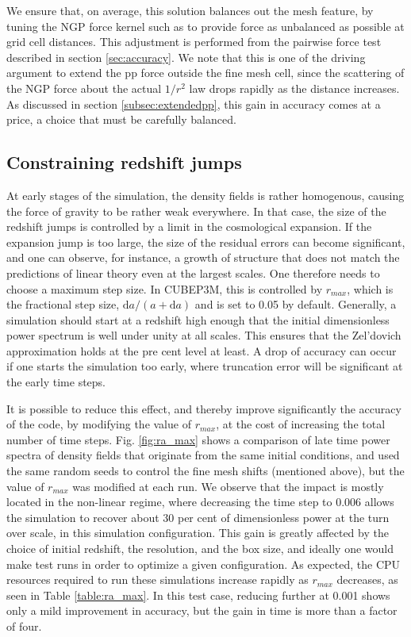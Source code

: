 We ensure that, on average, this solution balances out the mesh feature,
by tuning the NGP force kernel such as to provide  force as unbalanced as possible at grid cell distances.
This adjustment is performed from the pairwise force test described in section \ref{sec:accuracy}.
We note that this is one of the driving argument to extend the pp force outside the fine mesh cell,
since the scattering of the NGP force about the actual $1/r^{2}$ law drops rapidly as the distance increases.
As discussed in section \ref{subsec:extendedpp}, this gain in accuracy comes at a price,
a choice that  must be carefully balanced.

\subsection{Constraining redshift jumps}

At early stages of the simulation, the density fields is rather homogenous, causing the force of gravity to be
rather weak everywhere. In that case, the size of the redshift jumps is controlled by a limit in the cosmological expansion.
If the expansion jump is too large, the size of the residual errors can become significant, and one can observe, for instance,
a growth of structure that does not match the predictions of  linear theory even at the largest scales.
One therefore needs to choose a maximum step size. In {\small CUBEP3M}, this is controlled by $r_{max}$, which is the fractional step size,
$\mbox{d}a/(a + \mbox{d}a)$ and is set to 0.05 by default.  Generally, a simulation should start at a redshift high enough that
the initial dimensionless power spectrum is well under unity at all scales. This ensures that the Zel'dovich approximation
 holds at the pre cent level at least. A drop of accuracy can occur if one starts the simulation too early, where
 truncation error will be significant at the early time steps.


It is possible to reduce this effect, and thereby improve significantly 
the accuracy of the code, by modifying the value of $r_{max}$, at the cost of increasing the total number of time steps.
Fig. \ref{fig:ra_max} shows a comparison of late time power spectra of density fields that originate from the same initial conditions, and used the same random seeds to control the fine mesh shifts (mentioned above), but the value of $r_{max}$ was modified at each run. 
We observe that the impact is mostly located in the non-linear regime, where decreasing the time step to 0.006 
allows the simulation to recover about 30 per cent of dimensionless power at the turn over scale, in this simulation configuration.
This gain is greatly affected by the choice of initial redshift, the resolution, and the box size, and ideally one would make
test runs in order to optimize a given configuration.  
As expected, the {\small CPU} resources required to run these simulations increase rapidly as $r_{max}$ decreases, as seen in Table \ref{table:ra_max}. 
In this test case, reducing further at 0.001 shows only a mild improvement in accuracy, but the gain in time is more than a factor of four.


